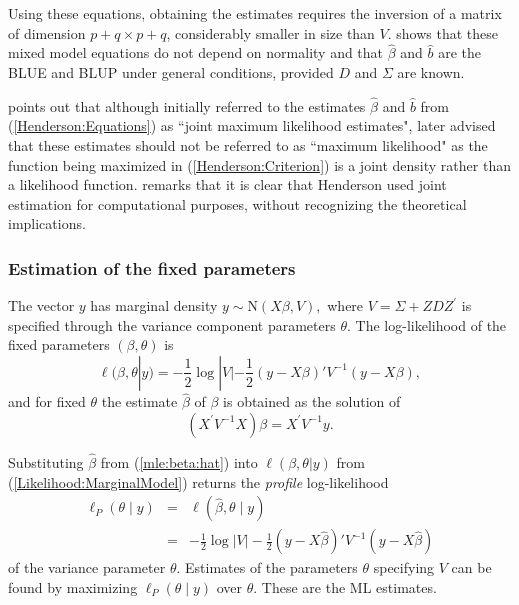 \documentclass[12pt, a4paper]{report}
\theoremstyle{plain}
\theoremstyle{definition}
\theoremstyle{remark}
\begin{document}
Using these equations, obtaining the estimates requires the inversion of a matrix
of dimension $p+q \times p+q$, considerably smaller in size than $V$. \citet{Henderson1963} shows that these mixed model equations do not depend on normality and that $\hat{\beta}$ and $\hat{b}$ are the BLUE and BLUP under general conditions, provided $D$ and $\Sigma$ are known.

\cite{Robi:BLUP:1991} points out that although \cite{Henderson:1950} initially referred to the estimates $\hat{\beta}$ and $\hat{b}$ from (\ref{Henderson:Equations}) as ``joint maximum likelihood estimates", \cite{Henderson:1973} later advised that these estimates should not be referred to as ``maximum likelihood" as the function being maximized in (\ref{Henderson:Criterion}) is a joint density rather than a likelihood function. \cite{Lee:Neld:Pawi:2006} remarks that it is clear that Henderson used joint estimation for computational purposes, without recognizing the theoretical implications.

\subsubsection{Estimation of the fixed parameters}

The vector $y$ has marginal density $y \sim \mathrm{N}(X \beta,V),$ where $V = \Sigma + ZDZ^\prime$ is specified through the variance component parameters $\theta.$ The log-likelihood of the fixed parameters $(\beta, \theta)$ is
\begin{equation}
\ell (\beta, \theta|y) =
-\frac{1}{2} \log |V| -\frac{1}{2}(y -
X \beta)'V^{-1}(y -
X \beta), \label{Likelihood:MarginalModel}
\end{equation}
and for fixed $\theta$ the estimate $\hat{\beta}$ of $\beta$ is obtained as the solution of
\begin{equation}
(X^\prime V^{-1}X) {\beta} = X^\prime V^{-1}y.
\label{mle:beta:hat}
\end{equation}

Substituting $\hat{\beta}$ from (\ref{mle:beta:hat}) into $\ell(\beta, \theta|y)$ from (\ref{Likelihood:MarginalModel}) returns the \emph{profile} log-likelihood
\begin{eqnarray*}
\ell_P(\theta \mid y) &=& \ell(\hat{\beta}, \theta \mid y) \\
&=& -\frac{1}{2} \log |V| -\frac{1}{2}(y - X \hat{\beta})'V^{-1}(y - X \hat{\beta})
\end{eqnarray*}
of the variance parameter $\theta.$ Estimates of the parameters $\theta$ specifying $V$ can be found by maximizing $\ell_P(\theta \mid y)$ over $\theta.$ These are the ML estimates.
\end{document}
